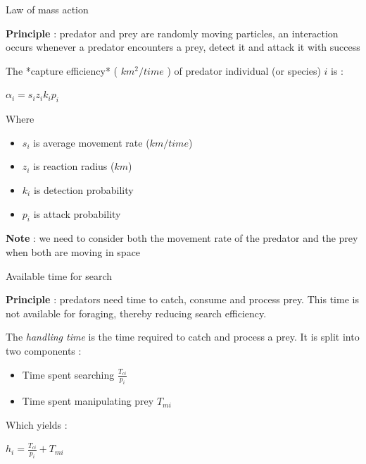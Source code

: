 \documentclass[10pt,aspectratio=149]{beamer}
\newcommand{\keyeq}[1]{%
  \begin{center}
    \Large$\displaystyle #1$
  \end{center}%
}
\begin{document}

\begin{frame}{Law of mass action}

    \textbf{Principle} : predator and prey are randomly moving particles, an interaction occurs whenever a predator encounters a prey, detect it and attack it with success

    The *capture efficiency* ( $km^2/time$ ) of predator individual (or species) $i$ is : 
    
    \keyeq{\alpha_i = s_iz_ik_ip_i}
    
    Where 
    \begin{itemize}
        \item $s_i$ is average movement rate ($km/time$)
        \item $z_i$ is reaction radius ($km$)
        \item $k_i$ is detection probability
        \item $p_i$ is attack probability
    \end{itemize}

    \textbf{Note} : we need to consider both the movement rate of the predator and the prey when both are moving in space

\end{frame}
    

\begin{frame}{Available time for search}

    \textbf{Principle} : predators need time to catch, consume and process prey. This time is not available for foraging, thereby reducing search efficiency. 

    The \textit{handling time} is the time required to catch and process a prey. It is split into two components : 

    \begin{itemize}
        \item Time spent searching $\frac{T_{ci}}{p_i}$
        \item Time spent manipulating prey $T_{mi}$
    \end{itemize}

    Which yields : 

    \keyeq{h_i = \frac{T_{ci}}{p_i} + T_{mi}}

\end{frame}
    
\end{document}
